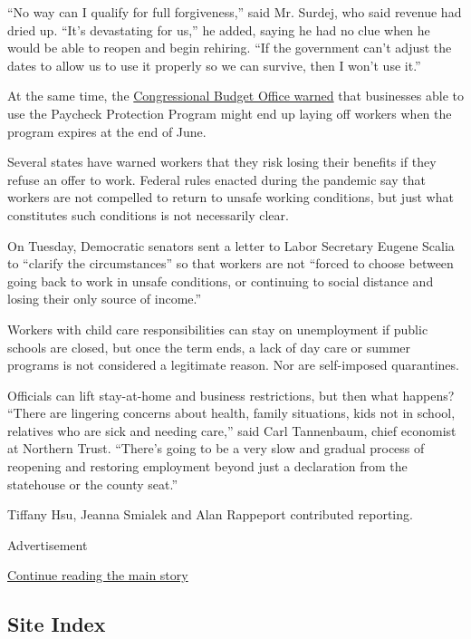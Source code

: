 ``No way can I qualify for full forgiveness,'' said Mr. Surdej, who said
revenue had dried up. ``It's devastating for us,'' he added, saying he
had no clue when he would be able to reopen and begin rehiring. ``If the
government can't adjust the dates to allow us to use it properly so we
can survive, then I won't use it.''

At the same time, the
\href{https://www.nytimes.com/2020/05/19/business/stock-market-today-coronavirus.html}{Congressional
Budget Office warned} that businesses able to use the Paycheck
Protection Program might end up laying off workers when the program
expires at the end of June.

Several states have warned workers that they risk losing their benefits
if they refuse an offer to work. Federal rules enacted during the
pandemic say that workers are not compelled to return to unsafe working
conditions, but just what constitutes such conditions is not necessarily
clear.

On Tuesday, Democratic senators sent a letter to Labor Secretary Eugene
Scalia to ``clarify the circumstances'' so that workers are not ``forced
to choose between going back to work in unsafe conditions, or continuing
to social distance and losing their only source of income.''

Workers with child care responsibilities can stay on unemployment if
public schools are closed, but once the term ends, a lack of day care or
summer programs is not considered a legitimate reason. Nor are
self-imposed quarantines.

Officials can lift stay-at-home and business restrictions, but then what
happens? ``There are lingering concerns about health, family situations,
kids not in school, relatives who are sick and needing care,'' said Carl
Tannenbaum, chief economist at Northern Trust. ``There's going to be a
very slow and gradual process of reopening and restoring employment
beyond just a declaration from the statehouse or the county seat.''

Tiffany Hsu, Jeanna Smialek and Alan Rappeport contributed reporting.

Advertisement

\protect\hyperlink{after-bottom}{Continue reading the main story}

\hypertarget{site-index}{%
\subsection{Site Index}\label{site-index}}

